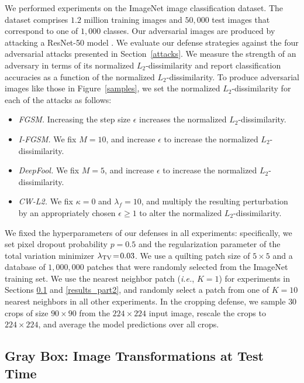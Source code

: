 We performed experiments on the ImageNet image classification dataset. The dataset comprises $1.2$ million training images and $50,000$ test images that correspond to one of $1,000$ classes. Our adversarial images are produced by attacking a ResNet-50 model \citep{he2016residual}. We evaluate our defense strategies against the four adversarial attacks presented in Section~\ref{attacks}. We measure the strength of an adversary in terms of its normalized $L_2$-dissimilarity and report classification accuracies as a function of the normalized $L_2$-dissimilarity. To produce adversarial images like those in Figure~\ref{samples}, we set the normalized $L_2$-dissimilarity for each of the attacks as follows:
\begin{itemize}
\setlength\itemsep{-1em}
\item \emph{FGSM.} Increasing the step size $\epsilon$ increases the normalized $L_2$-dissimilarity.\\
\item \emph{I-FGSM.} We fix $M \!=\! 10$, and increase $\epsilon$ to increase the normalized $L_2$-dissimilarity.\\
\item \emph{DeepFool.} We fix $M \!=\! 5$, and increase $\epsilon$ to increase the normalized $L_2$-dissimilarity.\\
\item \emph{CW-L2.} We fix $\kappa \!=\! 0$ and $\lambda_f \!=\! 10$, and multiply the resulting perturbation by an appropriately chosen $\epsilon \geq 1$ to alter the normalized $L_2$-dissimilarity.
\end{itemize}
We fixed the hyperparameters of our defenses in all experiments: specifically, we set pixel dropout probability $p \!=\! 0.5$ and the regularization parameter of the total variation minimizer $\lambda_{\operatorname{TV}} \!=\! 0.03$. We use a quilting patch size of $5 \! \times \! 5$ and a database of $1,000,000$ patches that were randomly selected from the ImageNet training set. We use the nearest neighbor patch (\emph{i.e.}, $K \! = \! 1$) for experiments in Sections \ref{results_part1} and \ref{results_part2}, and randomly select a patch from one of $K \! = \! 10$ nearest neighbors in all other experiments. In the cropping defense, we sample $30$ crops of size $90 \!\times\! 90$ from the $224 \!\times\! 224$ input image, rescale the crops to $224 \!\times\! 224$, and average the model predictions over all crops.

\subsection{Gray Box: Image Transformations at Test Time}
\label{results_part1}

